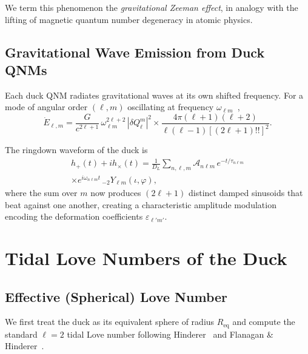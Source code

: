 \documentclass[aps,prd,twocolumn,superscriptaddress,nofootinbib]{revtex4-2}
\begin{document}
We term this phenomenon the \textit{gravitational Zeeman effect}, in
analogy with the lifting of magnetic quantum number degeneracy in atomic
physics.


\subsection{Gravitational Wave Emission from Duck QNMs}
\label{sec:qnm_gw}

Each duck QNM radiates gravitational waves at its own shifted frequency.
For a mode of angular order $(\ell, m)$ oscillating at frequency
$\omega_{\ell m}$~\cite{Thorne1980},
\begin{equation}
\dot{E}_{\ell,m} = \frac{G}{c^{2\ell+1}} \, \omega_{\ell m}^{2\ell+2} \,
|\delta Q_\ell^m|^2 \times
\frac{4\pi(\ell+1)(\ell+2)}{\ell(\ell-1)[(2\ell+1)!!]^2}.
\label{eq:qnm_power}
\end{equation}

The ringdown waveform of the duck is~\cite{BertiCardosoStarinets2009,
Isi2019}
\begin{multline}
h_+(t) + i h_\times(t) = \frac{1}{D_L} \sum_{n,\ell,m}
\mathcal{A}_{n\ell m} \, e^{-t/\tau_{n\ell m}} \\
\times e^{i \omega_{n\ell m} t} \,
{}_{-2}Y_{\ell m}(\iota, \varphi),
\label{eq:ringdown}
\end{multline}
where the sum over $m$ now produces $(2\ell+1)$ distinct damped sinusoids
that beat against one another, creating a characteristic amplitude
modulation encoding the deformation coefficients $\varepsilon_{\ell' m'}$.


\section{Tidal Love Numbers of the Duck}
\label{sec:love}

\subsection{Effective (Spherical) Love Number}
\label{sec:love_spherical}

We first treat the duck as its equivalent sphere of radius
$R_{\mathrm{eq}}$ and compute the standard $\ell = 2$ tidal Love number
following Hinderer~\cite{Hinderer2008} and Flanagan \&
Hinderer~\cite{FlanaganHinderer2008}.
\end{document}
